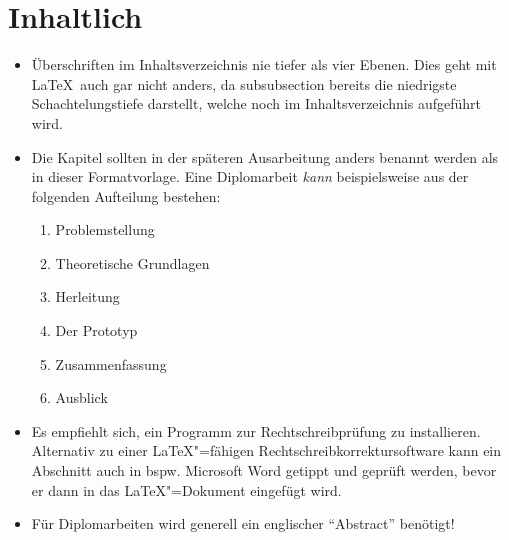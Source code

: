 \section{Inhaltlich}
\begin{itemize}
\item Überschriften im Inhaltsverzeichnis nie tiefer als
      vier Ebenen. Dies geht mit \LaTeX\ auch gar nicht anders,
      da {\ttfamily subsubsection} bereits die niedrigste
      Schachtelungstiefe darstellt, welche noch im
      Inhaltsverzeichnis aufgeführt wird.
\item Die Kapitel sollten in der späteren Ausarbeitung anders
      benannt werden als in dieser Formatvorlage. Eine Diplomarbeit
      \emph{kann} beispielsweise aus der folgenden Aufteilung bestehen:

      \begin{enumerate}
      \item Problemstellung
      \item Theoretische Grundlagen
      \item Herleitung
      \item Der Prototyp
      \item Zusammenfassung
      \item Ausblick
      \end{enumerate}
\item Es empfiehlt sich, ein Programm zur Rechtschreibprüfung zu
      installieren. Alternativ zu einer \LaTeX"=fähigen
      Rechtschreibkorrektursoftware kann ein Abschnitt auch
      in bspw. Microsoft Word getippt und geprüft werden, bevor
      er dann in das \LaTeX"=Dokument eingefügt wird.
\item Für Diplomarbeiten wird generell ein englischer "`Abstract"'
      benötigt!
\end{itemize}
